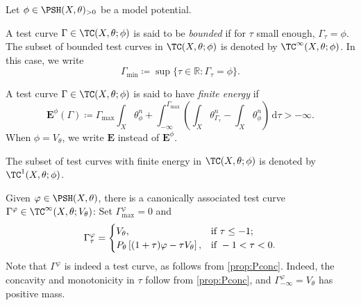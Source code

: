 \begin{definition}\label{def:relattestcurv}
    Let $\phi\in \PSH(X,\theta)_{>0}$ be a model potential.

    A test curve $\Gamma\in \TC(X,\theta;\phi)$ is said to be \emph{bounded} if for $\tau$ small enough, $\Gamma_{\tau}=\phi$. The subset of bounded test curves in $\TC(X,\theta;\phi)$ is denoted by $\TC^{\infty}(X,\theta;\phi)$.
    In this case, we write
    \begin{equation}\label{eq:Gammamin}
    \Gamma_{\min}\coloneqq \sup\{\tau\in \mathbb{R}:\Gamma_{\tau}=\phi\}.
    \end{equation}

    A test curve $\Gamma\in \TC(X,\theta;\phi)$ is said to have \emph{finite energy} if
    \begin{equation}\label{eq:tcfiniteenergy}
    \mathbf{E}^{\phi}(\Gamma)\coloneqq \Gamma_{\max} \int_X \theta_{\phi}^n+\int_{-\infty}^{\Gamma_{\max}} \left(\int_X\theta_{\Gamma_{\tau}}^n-\int_X \theta_{\phi}^n\right)\,\mathrm{d}\tau>-\infty.
    \end{equation}
    When $\phi=V_{\theta}$, we write $\mathbf{E}$ instead of $\mathbf{E}^{\phi}$.

    The subset of test curves with finite energy in $\TC(X,\theta;\phi)$ is denoted by $\TC^1(X,\theta;\phi)$.
\end{definition}

\begin{example}\label{ex:cantest}
    Given $\varphi\in \PSH(X,\theta)$, there is a canonically associated test curve $\Gamma^{\varphi}\in \TC^{\infty}(X,\theta;V_{\theta})$: Set $\Gamma^{\varphi}_{\max}=0$ and
    \[
    \Gamma^{\varphi}_{\tau}=
    \begin{cases}
        V_{\theta},&\textup{if }\tau\leq -1;\\
        P_{\theta}\left[ (1+\tau)\varphi-\tau V_{\theta} \right],& \textup{if }-1<\tau<0.
    \end{cases}
    \]
    Note that $\Gamma^{\varphi}$ is indeed a test curve, as follows from \cref{prop:Pconc}. Indeed, the concavity and monotonicity in $\tau$ follow from \cref{prop:Pconc}, and $\Gamma^\varphi_{-\infty}=V_\theta$ has positive mass.
\end{example}

